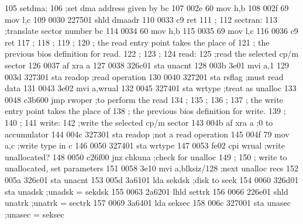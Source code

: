 105                setdma:
106                          ;set dma address given by bc
107    002e 60               mov      h,b
108    002f 69               mov      l,c
109    0030 227501           shld     dmaadr
110    0033 c9               ret
111                ;
112                sectran:
113                          ;translate sector number bc
114    0034 60               mov      h,b
115    0035 69               mov      l,c
116    0036 c9               ret
117                ;
118                ;
119                ;
120                ;         the read entry point takes the place of
121                ;         the previous bios definition for read.
122                ;
123                ;
124                read:
125                          ;read the selected cp/m sector
126    0037 af               xra      a
127    0038 326c01           sta      unacnt
128    003b 3e01             mvi      a,1
129    003d 327301           sta      readop                 ;read operation
130    0040 327201           sta      rsflag                 ;must read data
131    0043 3e02             mvi      a,wrual
132    0045 327401           sta      wrtype                 ;treat as unalloc
133    0048 c3b600           jmp      rwoper                 ;to perform the read
134                ;
135                ;
136                ;
137                ;         the write entry point takes the place of
138                ;         the previous bios definition for write.
139                ;
140                ;
141                write:
142                          ;write the selected cp/m sector
143    004b af               xra      a                      ;0 to accumulator
144    004c 327301           sta      readop                 ;not a read operation
145    004f 79               mov      a,c                    ;write type in c
146    0050 327401           sta      wrtype
147    0053 fe02             cpi      wrual                  ;write unallocated?
148    0050 c26f00           jnz      chkuna                 ;check for unalloc
149                ;
150                ;         write to unallocated, set parameters
151    0058 3e10             mvi      a,blksiz/128           ;next unalloc recs
152    005a 326c01           sta      unacnt
153    005d 3a6101           lda      sekdsk                 ;disk to seek
154    0060 326d01           sta      unadsk                 ;unadsk = sekdsk
155    0063 2a6201           lhld     settrk
156    0066 226e01           shld     unatrk                 ;unatrk = sectrk
157    0069 3a6401           lda      seksec
158    006c 327001           sta      unasec                 ;unasec = seksec
